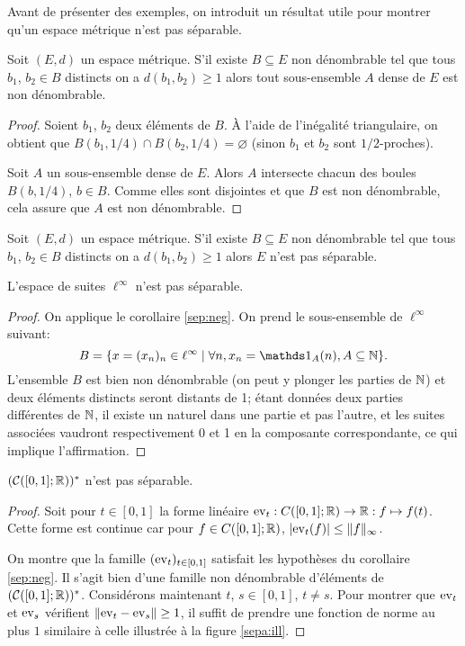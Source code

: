 Avant de présenter des exemples, on introduit un résultat utile pour montrer
qu'un espace métrique n'est pas séparable.

\begin{prop}
  Soit $(E, d)$ un espace métrique. S'il existe $B\subseteq E$ non dénombrable
  tel que tous $b_1$, $b_2\in B$ distincts on a $d(b_1, b_2)\geq 1$ alors
  tout sous-ensemble $A$ dense de $E$ est non dénombrable.
\end{prop}
\begin{proof}
  Soient $b_1$, $b_2$ deux éléments de $B$. \`A l'aide de l'inégalité
  triangulaire, on obtient que $B(b_1, 1/4)\cap B(b_2, 1/4)=\varnothing$
  (sinon $b_1$ et $b_2$ sont $1/2$-proches).

  Soit $A$ un sous-ensemble dense de $E$. Alors $A$ intersecte chacun des
  boules $B(b, 1/4)$, $b\in B$. Comme elles sont disjointes et que
  $B$ est non dénombrable, cela assure que $A$ est non dénombrable.
\end{proof}

\begin{cor}\label{sep:neg}
  Soit $(E, d)$ un espace métrique. S'il existe $B\subseteq E$ non dénombrable
  tel que tous $b_1$, $b_2\in B$ distincts on a $d(b_1, b_2)\geq 1$ alors
  $E$ n'est pas séparable.
\end{cor}

\begin{ex}
  L'espace de suites $\ell^\infty$ n'est pas séparable.
\end{ex}
\begin{proof}
  On applique le corollaire \ref{sep:neg}. On prend le sous-ensemble
  de $\ell^\infty$ suivant:
  $$B = \{x = (x_n)_n\in\ell^\infty\mid
  \forall n, x_n= \ind_A(n), A\subseteq \IN\}.$$
  L'ensemble $B$ est bien non dénombrable (on peut y plonger les parties
  de $\mathbb{N}$) et deux éléments distincts seront distants de 1; étant données
  deux parties différentes de $\mathbb{N}$, il existe un naturel dans une partie
  et pas l'autre, et les suites associées vaudront respectivement 0 et 1
  en la composante correspondante, ce qui implique l'affirmation.
\end{proof}

\begin{ex}
  $(\mathcal C([0, 1]; \mathbb{R}))^*$ n'est pas séparable.
\end{ex}
\begin{proof}
  Soit pour $t\in [0, 1]$ la forme linéaire $\mathrm{ev}_{t}: C([0, 1]; \mathbb{R}) \to \mathbb{R}:
  f\mapsto f(t)$. Cette forme est continue car pour $f\in C([0, 1]; \mathbb{R})$,
  $|\mathrm{ev}_t(f)|\leq \|f\|_\infty$.

  On montre que la famille $(\mathrm{ev}_t)_{t\in[0, 1]}$ satisfait les hypothèses
  du corollaire \ref{sep:neg}. Il s'agit bien d'une famille non dénombrable
  d'éléments de $(\mathcal C([0, 1]; \mathbb{R}))^*$. Considérons maintenant $t$, $s
  \in[0, 1]$, $t\neq s$. Pour montrer que $\mathrm{ev}_t$ et $\mathrm{ev}_s$ vérifient
  $\|\mathrm{ev}_t-\mathrm{ev}_s\|\geq 1$, il suffit de prendre une fonction de norme au
  plus $1$ similaire à celle illustrée à la figure \ref{sepa:ill}.
  
\end{proof}

